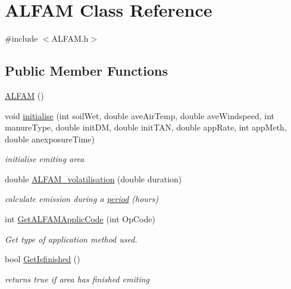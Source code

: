 \hypertarget{class_a_l_f_a_m}{
\section{ALFAM Class Reference}
\label{class_a_l_f_a_m}
}


{\ttfamily \#include $<$ALFAM.h$>$}\subsection*{Public Member Functions}
\begin{DoxyCompactItemize}
\item 
\hyperlink{class_a_l_f_a_m_a47d3c530b41e72e8c529ec2cf4abce6a}{ALFAM} ()
\item 
void \hyperlink{class_a_l_f_a_m_ae4afb7f15146779a48856bc9c2b6998c}{initialise} (int soilWet, double aveAirTemp, double aveWindspeed, int manureType, double initDM, double initTAN, double appRate, int appMeth, double anexposureTime)
\begin{DoxyCompactList}\small\item\em initialise emiting area \item\end{DoxyCompactList}\item 
double \hyperlink{class_a_l_f_a_m_a62aa5a49fec33e4706b60b907e7170f3}{ALFAM\_\-volatilisation} (double duration)
\begin{DoxyCompactList}\small\item\em calculate emission during a \hyperlink{classperiod}{period} (hours) \item\end{DoxyCompactList}\item 
int \hyperlink{class_a_l_f_a_m_ac888410a9da9ca21e48daa4abc468614}{GetALFAMApplicCode} (int OpCode)
\begin{DoxyCompactList}\small\item\em Get type of application method used. \item\end{DoxyCompactList}\item 
bool \hyperlink{class_a_l_f_a_m_a5e3967d1a434cf9367281cfe881c65d6}{GetIsfinished} ()
\begin{DoxyCompactList}\small\item\em returns true if area has finished emiting \item\end{DoxyCompactList}\end{DoxyCompactItemize}
